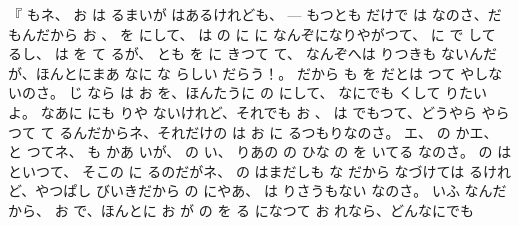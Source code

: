 『
もネ、
お
は
るまいが
はあるけれども、 --- もつとも
だけで
は
なのさ、だもんだから
お
、
を
にして、
は
の
に
に
なんぞになりやがつて、
に
で
して
るし、
は
を
て
るが、
とも
を
に
きつて
て、
なんぞへは
りつきも
ないんだが、ほんとにまあ
なに
な
らしい
だらう！。
だから
も
を
だとは
つて
やしないのさ。
じ
なら
は
お
を、ほんたうに
の
にして、
なにでも
くして
りたいよ。
なあに
にも
りや
ないけれど、それでも
お
、
は
でもつて、どうやら
やら
つて
て
るんだからネ、それだけの
は
お
に
るつもりなのさ。
エ、
の
かエ、
と
つてネ、
も
かあ
いが、
の
い、
りあの
の
ひな
の
を
いてる
なのさ。
の
は
といつて、
そこの
に
るのだがネ、
の
はまだしも
な
だから
なづけては
るけれど、やつぱし
びいきだから
の
にやあ、
は
りさうもない
なのさ。
いふ
なんだから、
お
で、ほんとに
お
が
の
を
る
になつて
お
れなら、どんなにでも
